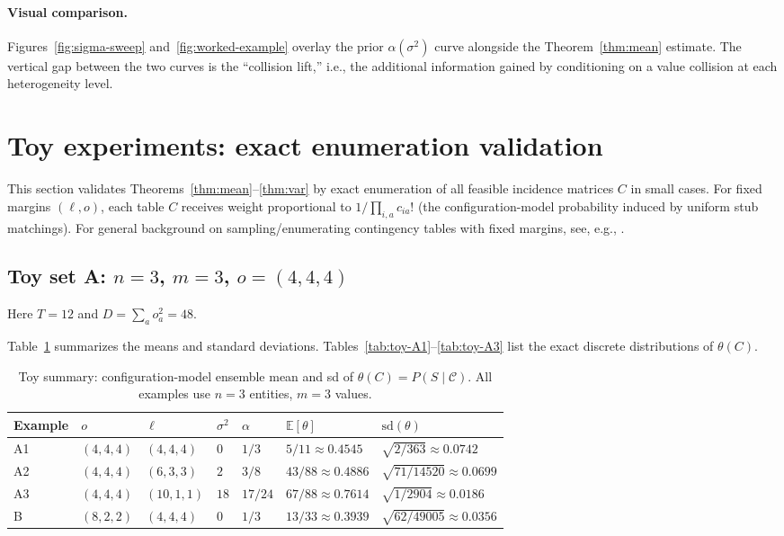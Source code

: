 \documentclass[11pt]{article}
\newcommand{\E}{\mathbb{E}}
\newcommand{\1}{\mathbf{1}}
\newcommand{\coll}{\mathcal{C}} %
\theoremstyle{plain}
\theoremstyle{definition}
\begin{document}
\paragraph{Visual comparison.}
Figures~\ref{fig:sigma-sweep} and~\ref{fig:worked-example} overlay the prior $\alpha(\sigma^2)$ curve alongside the Theorem~\ref{thm:mean} estimate.
The vertical gap between the two curves is the ``collision lift,'' i.e., the additional information gained by conditioning on a value collision at each heterogeneity level.

\section{Toy experiments: exact enumeration validation}
\label{sec:toy}

This section validates Theorems~\ref{thm:mean}--\ref{thm:var} by exact enumeration of all feasible incidence matrices $C$ in small cases.
For fixed margins $(\ell,o)$, each table $C$ receives weight proportional to $1/\prod_{i,a} c_{ia}!$ (the configuration-model probability induced by uniform stub matchings).
For general background on sampling/enumerating contingency tables with fixed margins, see, e.g.,
\cite{diaconisgangolli1995,diaconis1998algebraic,dyer1997,chen2005smc,patefield1981}.


\subsection{Toy set A: \texorpdfstring{$n=3$, $m=3$, $o=(4,4,4)$}{n=3, m=3, o=(4,4,4)}}
Here $T=12$ and $D=\sum_a o_a^2 = 48$.

Table~\ref{tab:toy-summary} summarizes the means and standard deviations.
Tables~\ref{tab:toy-A1}--\ref{tab:toy-A3} list the exact discrete distributions of $\theta(C)$.

\begin{table}[htbp]
\centering
\caption{Toy summary: configuration-model ensemble mean and sd of $\theta(C)=P(S\mid \coll)$.
All examples use $n=3$ entities, $m=3$ values.}
\label{tab:toy-summary}
\begin{tabular}{@{}lllllll@{}}
\toprule
Example & $o$ & $\ell$ & $\sigma^2$ & $\alpha$ & $\E[\theta]$ & $\mathrm{sd}(\theta)$\\
\midrule
A1 & $(4,4,4)$ & $(4,4,4)$ & $0$ & $1/3$ & $5/11 \approx 0.4545$ & $\sqrt{2/363}\approx 0.0742$\\
A2 & $(4,4,4)$ & $(6,3,3)$ & $2$ & $3/8$ & $43/88 \approx 0.4886$ & $\sqrt{71/14520}\approx 0.0699$\\
A3 & $(4,4,4)$ & $(10,1,1)$ & $18$ & $17/24$ & $67/88 \approx 0.7614$ & $\sqrt{1/2904}\approx 0.0186$\\
B  & $(8,2,2)$ & $(4,4,4)$ & $0$ & $1/3$ & $13/33 \approx 0.3939$ & $\sqrt{62/49005}\approx 0.0356$\\
\bottomrule
\end{tabular}
\end{table}
\end{document}
